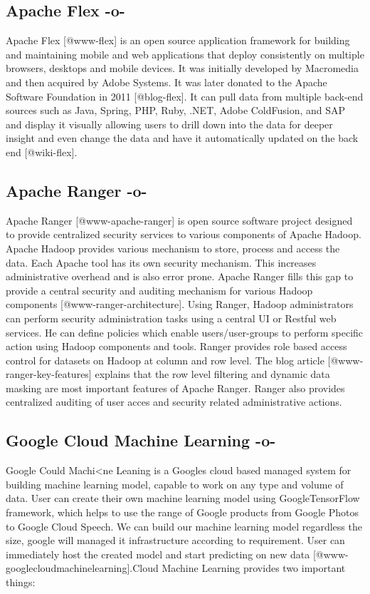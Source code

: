 \subsection{Apache Flex -o-}

Apache Flex [@www-flex] is an open source application framework
for building and maintaining mobile and web applications that deploy
consistently on multiple browsers, desktops and mobile devices. It was
initially developed by Macromedia and then acquired by Adobe
Systems. It was later donated to the Apache Software Foundation in
2011 [@blog-flex]. It can pull data from multiple back-end sources
such as Java, Spring, PHP, Ruby, .NET, Adobe ColdFusion, and SAP and
display it visually allowing users to drill down into the data for
deeper insight and even change the data and have it automatically
updated on the back end [@wiki-flex].

\subsection{Apache Ranger -o-}

Apache Ranger [@www-apache-ranger] is open source software project
designed to provide centralized security services to various
components of Apache Hadoop. Apache Hadoop provides various mechanism
to store, process and access the data. Each Apache tool has its own
security mechanism. This increases administrative overhead and is also
error prone.  Apache Ranger fills this gap to provide a central
security and auditing mechanism for various Hadoop
components [@www-ranger-architecture]. Using Ranger, Hadoop
administrators can perform security administration tasks using a
central UI or Restful web services. He can define policies which
enable users/user-groups to perform specific action using Hadoop
components and tools. Ranger provides role based access control for
datasets on Hadoop at column and row level.  The blog
article [@www-ranger-key-features] explains that the row level
filtering and dynamic data masking are most important features of
Apache Ranger. Ranger also provides centralized auditing of user acces
and security related administrative actions.
     
\subsection{Google Cloud Machine Learning -o-}
     
Google Could Machi<ne Leaning is a Googles cloud based managed system
for building machine learning model, capable to work on any type and
volume of data. User can create their own machine learning model using
GoogleTensorFlow framework, which helps to use the range of Google
products from Google Photos to Google Cloud Speech.  We can build our
machine learning model regardless the size, google will managed it
infrastructure according to requirement. User can immediately host the
created model and start predicting on new
data [@www-googlecloudmachinelearning].Cloud Machine Learning
provides two important things:
     
